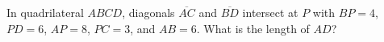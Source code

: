 In quadrilateral $ABCD$, diagonals $\overline{AC}$ and $\overline{BD}$ intersect at $P$ with $BP = 4$, $P D = 6$, $AP = 8$, $P C = 3$, and $AB = 6$. What is the length of $AD$?
